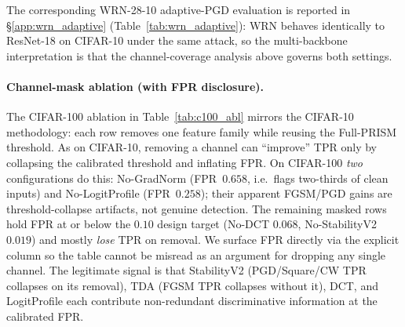 The corresponding WRN-28-10 adaptive-PGD evaluation is reported in
\S\ref{app:wrn_adaptive} (Table~\ref{tab:wrn_adaptive}): WRN behaves
identically to ResNet-18 on CIFAR-10 under the same attack, so the
multi-backbone interpretation is that the channel-coverage
analysis above governs both settings.

\begin{table}[h]
\centering
\small

\caption{Adaptive PGD on CIFAR-100 (ResNet-18), 5 seeds pooled.}
\label{tab:c100_adaptive}
\end{table}

\paragraph{Channel-mask ablation (with FPR disclosure).}
The CIFAR-100 ablation in Table~\ref{tab:c100_abl} mirrors the
CIFAR-10 methodology: each row removes one feature family while reusing
the Full-PRISM threshold. As on CIFAR-10, removing a channel can ``improve'' TPR only by
collapsing the calibrated threshold and inflating FPR. On CIFAR-100
\emph{two} configurations do this: No-GradNorm (FPR~$0.658$, i.e.\ flags
two-thirds of clean inputs) and No-LogitProfile (FPR~$0.258$); their
apparent FGSM/PGD gains are threshold-collapse artifacts, not genuine
detection. The remaining masked rows hold FPR at or below the $0.10$
design target (No-DCT $0.068$, No-StabilityV2 $0.019$) and mostly
\emph{lose} TPR on removal. We surface FPR directly via the
explicit column so the table cannot be misread as an argument for
dropping any single channel. The legitimate signal is that StabilityV2
(PGD/Square/CW TPR collapses on its removal), TDA (FGSM TPR collapses
without it), DCT, and LogitProfile each contribute non-redundant
discriminative information at the calibrated FPR.

\begin{table}[h]
\centering
\small

\caption{%
  CIFAR-100 channel-mask ablation (5 seeds, $n=1000$, per-attack TPR + FPR).
  Rows whose FPR exceeds the $0.10$ design target indicate threshold
  collapse, not improved detection; they are reported here for
  symmetry with Table~\ref{tab:ablation} only.
  \textbf{Baseline row.} ``Full PRISM (ablation cal.)'' is the
  \emph{ablation-internal} baseline: the ablation pipeline refits one
  split-conformal threshold shared by every channel-mask arm, so each
  masked row is measured against a common operating point. The canonical
  Full PRISM numbers are the CIFAR-100 row of Table~\ref{tab:main_multi}
  (FGSM $0.835$, PGD $0.984$, Square $0.672$, CW $0.687$, FPR $0.077$),
  from the detection pipeline's canonical calibrator on the \emph{same}
  eval split $[8000,10000]$, 5 seeds, $n{=}1000$. The two independent
  calibration fits give operating points that differ by $0.1$--$0.8$~pp
  TPR (mean $0.4$~pp; largest on CW, $0.679$ vs $0.687$) and $0.4$~pp FPR
  ($0.073$ vs $0.077$); every value here lies within the Wilson 95\% CIs
  of Table~\ref{tab:main_multi}, which is the row to cite as canonical.
}
\label{tab:c100_abl}
\end{table}

